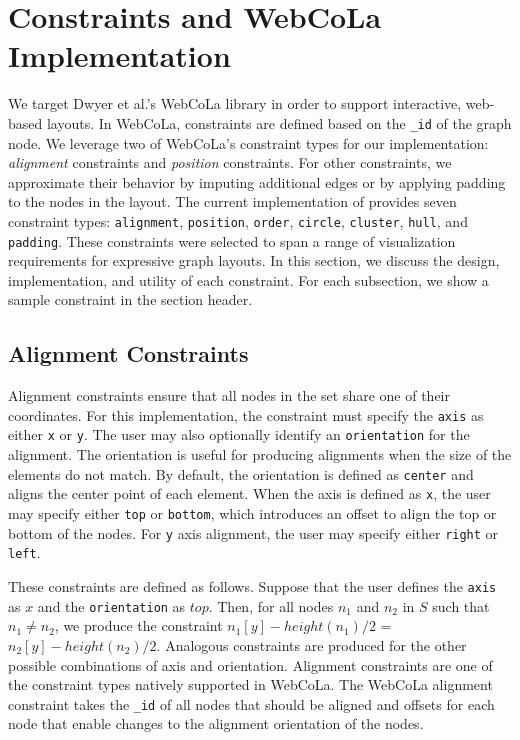 \section{\projectname Constraints and WebCoLa Implementation}
\label{sec:constraints}

We target  Dwyer et al.'s WebCoLa library \cite{WebCoLa} in order to support
interactive, web-based layouts.
In WebCoLa, constraints are defined based on the \texttt{\_id} of the
graph node. We leverage two of WebCoLa's
constraint types for our implementation: \emph{alignment} constraints 
and \emph{position} constraints. For other \projectname constraints, we
approximate their behavior by imputing additional edges or by applying
padding to the nodes in the layout. The current implementation of
\projectname provides seven constraint types:
\texttt{alignment}, \texttt{position}, \texttt{order}, \texttt{circle},
\texttt{cluster}, \texttt{hull}, and \texttt{padding}. These constraints
were selected to span a range of visualization requirements for expressive
graph layouts. In this section, we discuss the design, implementation, 
and utility of each \projectname constraint. For each subsection, we show 
a sample \projectname constraint in the section header.

\subsection{Alignment Constraints}
Alignment constraints ensure that all nodes in the set share one of their
coordinates. For this implementation, the constraint must specify the \texttt{axis}
as either \texttt{x} or \texttt{y}.
The user may also optionally identify an \texttt{orientation} for the alignment.
The orientation is useful for producing alignments when the size of the
elements do not match. By default, the orientation is defined as \texttt{center}
and aligns the center point of each element. When the axis is defined as \texttt{x},
the user may specify either \texttt{top} or \texttt{bottom}, which introduces
an offset to align the top or bottom of the nodes. For \texttt{y} axis
alignment, the user may specify either \texttt{right} or \texttt{left}.

These constraints are defined as follows.  Suppose that
the user defines the \texttt{axis}
as $x$ and the \texttt{orientation} as $top$.  Then, for all
nodes $n_1$ and $n_2$ in $S$
such that $n_1 \neq n_2$, we produce the constraint
$n_1[y] - height(n_1)/2$ = $n_2[y] - height(n_2)/2$.  Analogous constraints
are produced for the other possible combinations of axis and orientation.
Alignment constraints are one of the constraint types natively supported in
WebCoLa. The WebCoLa alignment constraint takes the \texttt{\_id} of all nodes
that should be aligned and offsets for each node that enable changes to the
alignment orientation of the nodes.

